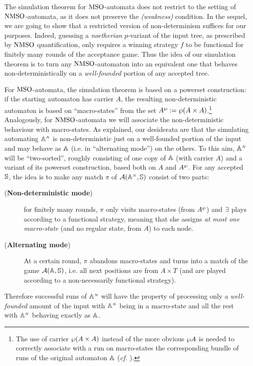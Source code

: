The simulation theorem for $\mathrm{MSO}$-automata does not restrict to the setting of $\mathrm{NMSO}$-automata, as it does not preserve the \emph{(weakness)} condition. In the sequel, we are going to show that a restricted version of non-determinism suffices for our purposes. Indeed, guessing a \emph{noetherian} $p$-variant of the input tree, as prescribed by $\mathrm{NMSO}$ quantification, only requires a winning strategy $f$ to be functional for finitely many rounds of the acceptance game. Thus the idea of our simulation theorem is to turn any $\mathrm{NMSO}$-automaton into an equivalent one that behaves non-deterministically on a \emph{well-founded} portion of any accepted tree.

For $\mathrm{MSO}$-automata, the simulation theorem is based on a powerset construction: if the starting automaton has carrier $A$, the resulting non-deterministic automaton is based on ``macro-states'' from the set $A^{\wp} := \wp (A \times A)$.\footnote{The use of carrier $\wp (A \times A)$ instead of the more obvious $\wp A$ is needed to correctly associate with a run on macro-states the corresponding bundle of runs of the original automaton $\mathbb{A}$ (\emph{cf.} \cite{Walukiewicz96}).} Analogously, for $\mathrm{NMSO}$-automata we will associate the non-deterministic behaviour with macro-states. As explained, our desiderata are that the simulating automating $\mathbb{A}^{{\scriptscriptstyle N}}$ is non-deterministic just on a well-founded portion of the input and may behave as $\mathbb{A}$ (i.e. in ``alternating mode'') on the others. To this aim, $\mathbb{A}^{{\scriptscriptstyle N}}$ will be ``two-sorted'', roughly consisting of one copy of $\mathbb{A}$ (with carrier $A$) and a variant of its powerset construction, based both on $A$ and $A^{\wp}$. For any accepted $\mathbb{S}$, the idea is to make any match $\pi$ of $\mathcal{A}(\mathbb{A}^{{\scriptscriptstyle N}},\mathbb{S})$ consist of two parts:
\begin{description}
  \item[(\textbf{Non-deterministic mode})] for finitely many rounds, $\pi$ only visits macro-states (from $A^{\wp}$) and $\exists$ plays according to a functional strategy, meaning that she assigns \emph{at most one macro-state} (and no regular state, from $A$) to each node.%
  \item[(\textbf{Alternating mode})] At a certain round, $\pi$ abandons macro-states and turns into a match of the game $\mathcal{A}(\mathbb{A},\mathbb{S})$, i.e. all next positions are from $A \times T$ (and are played according to a non-necessarily functional strategy). %
\end{description}
Therefore successful runs of $\mathbb{A}^{{\scriptscriptstyle N}}$ will have the property of processing only a \emph{well-founded} amount of the input with $\mathbb{A}^{{\scriptscriptstyle N}}$ being in a macro-state and all the rest with $\mathbb{A}^{{\scriptscriptstyle N}}$ behaving exactly as $\mathbb{A}$.

